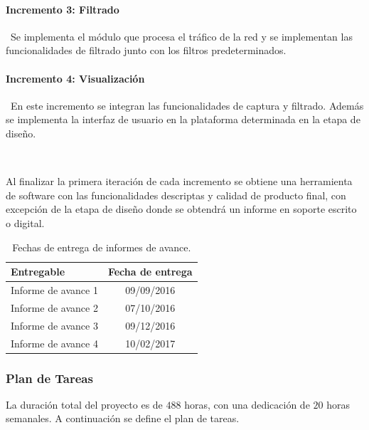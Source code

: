 \paragraph{Incremento 3: Filtrado} \
Se implementa el módulo que procesa el tráfico de la red y se implementan las funcionalidades de filtrado junto con los filtros predeterminados.
\paragraph{Incremento 4: Visualización} \
En este incremento se integran las funcionalidades de captura y filtrado. Además se implementa la interfaz de usuario en la plataforma determinada en la etapa de diseño.

\ \

Al finalizar la primera iteración de cada incremento se obtiene una herramienta de software con las funcionalidades descriptas y calidad de producto final, con excepción de la etapa de diseño donde se obtendrá un informe en soporte escrito o digital.


\begin{table}[htbp]
	\begin{center}	
		\begin{tabular}{|l|c|}
			\hline 
			Entregable & Fecha de entrega \\ \hline
			Informe de avance 1 & 09/09/2016 \\
			Informe de avance 2 & 07/10/2016 \\
			Informe de avance 3 & 09/12/2016 \\
			Informe de avance 4 & 10/02/2017 \\ \hline
		\end{tabular}
	\end{center}
	\caption{Fechas de entrega de informes de avance.}
	\label{table:informes}
\end{table}

\subsubsection*{Plan de Tareas}

La duración total del proyecto es de $488$ horas, con una dedicación de $20$ horas semanales. A continuación se define el plan de tareas.

